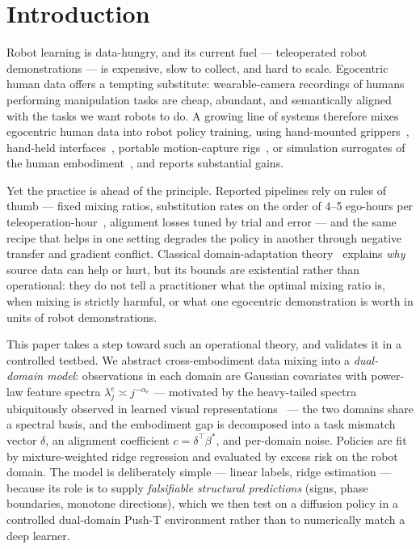 \section{Introduction}
\label{sec:intro}

Robot learning is data-hungry, and its current fuel --- teleoperated robot demonstrations --- is expensive, slow to collect, and hard to scale.
Egocentric human data offers a tempting substitute: wearable-camera recordings of humans performing manipulation tasks are cheap, abundant, and semantically aligned with the tasks we want robots to do.
A growing line of systems therefore mixes egocentric human data into robot policy training, using hand-mounted grippers~\cite{kareer2024egomimic}, hand-held interfaces~\cite{chi2024universal}, portable motion-capture rigs~\cite{wang2024dexcap}, or simulation surrogates of the human embodiment~\cite{egobridge2025}, and reports substantial gains.

Yet the practice is ahead of the principle. Reported pipelines rely on rules of thumb --- fixed mixing ratios, substitution rates on the order of 4--5 ego-hours per teleoperation-hour~\cite{zevaego2025}, alignment losses tuned by trial and error --- and the same recipe that helps in one setting degrades the policy in another through negative transfer and gradient conflict.
Classical domain-adaptation theory~\cite{bendavid2010theory,zhao2019learning} explains \emph{why} source data can help or hurt, but its bounds are existential rather than operational: they do not tell a practitioner what the optimal mixing ratio is, when mixing is strictly harmful, or what one egocentric demonstration is worth in units of robot demonstrations.

This paper takes a step toward such an operational theory, and validates it in a controlled testbed.
We abstract cross-embodiment data mixing into a \emph{dual-domain model}: observations in each domain are Gaussian covariates with power-law feature spectra $\lambda^e_j \asymp j^{-\alpha_e}$ --- motivated by the heavy-tailed spectra ubiquitously observed in learned visual representations~\cite{martin2021implicit} --- the two domains share a spectral basis, and the embodiment gap is decomposed into a task mismatch vector $\delta$, an alignment coefficient $c = \delta^\top\beta^*$, and per-domain noise.
Policies are fit by mixture-weighted ridge regression and evaluated by excess risk on the robot domain.
The model is deliberately simple --- linear labels, ridge estimation --- because its role is to supply \emph{falsifiable structural predictions} (signs, phase boundaries, monotone directions), which we then test on a diffusion policy in a controlled dual-domain Push-T environment rather than to numerically match a deep learner.

